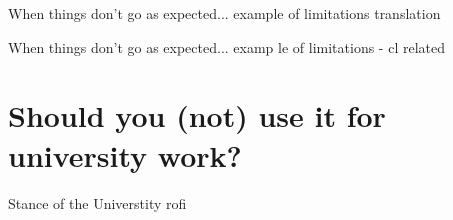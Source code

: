 \documentclass[aspectratio=169,hyperref={unicode}]{beamer}
\begin{document}
\begin{frame}{When things don't go as expected...}
	example of limitations translation
\end{frame}

\begin{frame}{When things don't go as expected...}
	examp                                                                                                                                                                                                                                                                                                                                                                                                                                                                                                                                                                                                                                                                                                                                                                                                                                                                                                                                                                                                                                                                                                                                                                                                                                                                                                                                                                                                                                                                                                                                                                                                                                                                                                                                                                                                               le of limitations - cl related
\end{frame}

\section{Should you (not) use it for university work?}

\begin{frame}{Stance of the Universtity}
	rofi
\end{frame}
\end{document}
